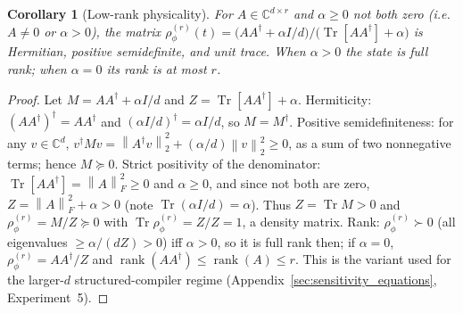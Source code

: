 \documentclass[twocolumn,aps,prxquantum,superscriptaddress,nofootinbib,floatfix,longbibliography]{revtex4-2}
\newtheorem{corollary}[theorem]{Corollary}
\DeclareMathOperator{\Tr}{Tr}
\DeclareMathOperator{\rank}{rank}
\newcommand{\C}{\mathbb{C}}
\newcommand{\norm}[1]{\left\lVert #1 \right\rVert}
\begin{document}
\begin{corollary}[Low-rank physicality]
\label{cor:low_rank}
For $A\in\C^{d\times r}$ and $\alpha\ge0$ not both zero (i.e.\ $A\ne0$ or $\alpha>0$), the matrix $\rho_\phi^{(r)}(t)=\big(A A^\dagger+\alpha I/d\big)/\big(\Tr[AA^\dagger]+\alpha\big)$ is Hermitian, positive semidefinite, and unit trace. When $\alpha>0$ the state is full rank; when $\alpha=0$ its rank is at most $r$.
\end{corollary}
\begin{proof}
Let $M=AA^\dagger+\alpha I/d$ and $Z=\Tr[AA^\dagger]+\alpha$. Hermiticity: $(AA^\dagger)^\dagger=AA^\dagger$ and $(\alpha I/d)^\dagger=\alpha I/d$, so $M=M^\dagger$. Positive semidefiniteness: for any $v\in\C^d$, $v^\dagger M v=\norm{A^\dagger v}_2^2+(\alpha/d)\norm{v}_2^2\ge0$, as a sum of two nonnegative terms; hence $M\succeq0$. Strict positivity of the denominator: $\Tr[AA^\dagger]=\norm{A}_F^2\ge0$ and $\alpha\ge0$, and since not both are zero, $Z=\norm{A}_F^2+\alpha>0$ (note $\Tr(\alpha I/d)=\alpha$). Thus $Z=\Tr M>0$ and $\rho_\phi^{(r)}=M/Z\succeq0$ with $\Tr\rho_\phi^{(r)}=Z/Z=1$, a density matrix. Rank: $\rho_\phi^{(r)}\succ0$ (all eigenvalues $\ge\alpha/(dZ)>0$) iff $\alpha>0$, so it is full rank then; if $\alpha=0$, $\rho_\phi^{(r)}=AA^\dagger/Z$ and $\rank(AA^\dagger)\le\rank(A)\le r$. This is the variant used for the larger-$d$ structured-compiler regime (Appendix~\ref{sec:sensitivity_equations}, Experiment~5).
\end{proof}
\end{document}

